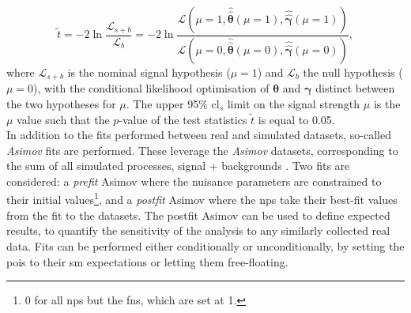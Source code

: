 \begin{equation}
    \tilde{t} = -2 \ln \frac{\mathcal{L}_{s+b}}{\mathcal{L}_{b}} = -2 \ln \frac{\mathcal{L}\left(\mu = 1, \hat{\hat{\boldsymbol{\theta}}}(\mu = 1), \hat{\hat{\boldsymbol{\gamma}}}(\mu = 1) \right)}{\mathcal{L}\left(\mu = 0, \hat{\hat{\boldsymbol{\theta}}}(\mu = 0), \hat{\hat{\boldsymbol{\gamma}}}(\mu = 0) \right)},
\end{equation}
where $\mathcal{L}_{s+b}$ is the nominal signal hypothesis ($\mu = 1$) and $\mathcal{L}_{b}$ the null hypothesis ($\mu = 0$), with the conditional likelihood optimisation of $\boldsymbol{\theta}$ and $\boldsymbol{\gamma}$ distinct between the two hypotheses for $\mu$. The upper 95\% \gls{cl}$_s$ limit on the signal strength $\mu$ is the $\mu$ value such that the $p$-value of the test statistics $\tilde{t}$ is equal to 0.05.\\

In addition to the fits performed between real and simulated datasets, so-called \textit{Asimov} fits are performed. These leverage the \textit{Asimov} datasets, corresponding to the sum of all simulated processes, signal + backgrounds \cite{asympForm}. Two fits are considered: a \textit{prefit} Asimov where the nuisance parameters are constrained to their initial values\footnote{0 for all \glspl{np} but the \glspl{fn}, which are set at 1.}, and a \textit{postfit} Asimov where the \glspl{np} take their best-fit values from the fit to the datasets. The postfit Asimov can be used to define expected results, to quantify the sensitivity of the analysis to any similarly collected real data. Fits can be performed either conditionally or unconditionally, by setting the \glspl{poi} to their \gls{sm} expectations or letting them free-floating. 

